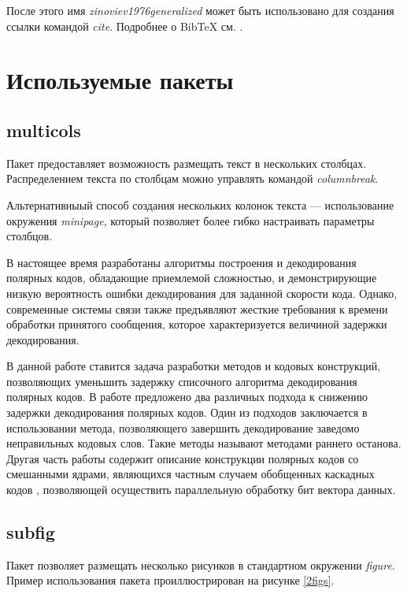 После этого имя {\em zinoviev1976generalized} может быть использовано для создания ссылки командой {\em cite}.
Подробнее о BibTeX см. \cite{latexBib}.

\clearpage
\section{Используемые пакеты}
\subsection{multicols}
Пакет предоставляет возможность размещать текст в нескольких столбцах.
Распределением текста по столбцам можно управлять командой {\em columnbreak}.

Альтернативныый способ создания нескольких колонок текста --- использование окружения {\em minipage}, который позволяет более гибко настраивать параметры столбцов.

\begin{multicols}{3}
В настоящее время разработаны алгоритмы построения и декодирования полярных кодов, обладающие приемлемой сложностью, и демонстрирующие низкую вероятность ошибки декодирования для заданной скорости кода.
Однако, современные системы связи также предъявляют жесткие требования к времени обработки принятого сообщения, которое характеризуется величиной задержки декодирования.

В данной работе ставится задача разработки методов и кодовых конструкций, позволяющих уменьшить задержку списочного алгоритма декодирования полярных кодов.
В работе предложено два различных подхода к снижению задержки декодирования полярных кодов.
Один из подходов заключается в использовании метода, позволяющего завершить декодирование заведомо неправильных кодовых слов. 
Такие методы называют методами раннего останова.
Другая часть работы содержит описание конструкции полярных кодов со смешанными ядрами, являющихся частным случаем обобщенных каскадных кодов \cite{zinoviev1976generalized}, позволяющей осуществить параллельную обработку бит вектора данных.
\end{multicols}

\subsection{subfig}
Пакет позволяет размещать несколько рисунков в стандартном окружении {\em figure}.
Пример использования пакета проиллюстрирован на рисунке \ref{2figs}.


